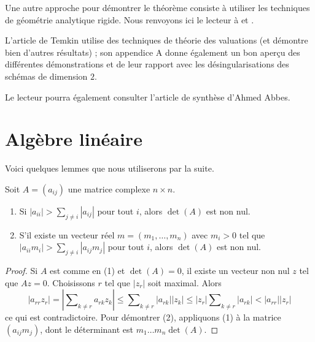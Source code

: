 \medskip\noindent
Une autre approche pour démontrer le théorème consiste à utiliser
les techniques de géométrie analytique rigide. Nous renvoyons ici le lecteur à
\cite{vanderPut} et \cite{Arzdorf-Wewers}.

\medskip\noindent
L'article \cite{Temkin} de Temkin utilise des techniques de théorie des valuations
(et démontre bien d'autres résultats) ; son appendice A donne également
un bon aperçu des différentes démonstrations et de leur rapport avec
les désingularisations des schémas de dimension $2$.

\medskip\noindent
Le lecteur pourra également consulter l'article de synthèse
\cite{Abbes-ssr} d'Ahmed Abbes.






\section{Algèbre linéaire}
\label{section-linear-algebra}

\noindent
Voici quelques lemmes que nous utiliserons par la suite.

\begin{lemma}
\label{lemma-recurring}
\begin{reference}
\cite[Theorem I]{Taussky}
\end{reference}
Soit $A = (a_{ij})$ une matrice complexe $n \times n$.
\begin{enumerate}
\item Si $|a_{ii}| > \sum_{j \not = i} |a_{ij}|$ pour tout $i$, alors
$\det(A)$ est non nul.
\item S'il existe un vecteur réel $m = (m_1, \ldots, m_n)$
avec $m_i > 0$ tel que $|a_{ii} m_i| > \sum_{j \not = i} |a_{ij}m_j|$
pour tout $i$, alors $\det(A)$ est non nul.
\end{enumerate}
\end{lemma}

\begin{proof}
Si $A$ est comme en (1) et $\det(A) = 0$, il existe un vecteur non nul
$z$ tel que $Az = 0$. Choisissons $r$ tel que $|z_r|$ soit maximal. Alors
$$
|a_{rr} z_r| = |\sum\nolimits_{k \not = r} a_{rk}z_k| \leq
\sum\nolimits_{k \not = r} |a_{rk}||z_k| \leq
|z_r| \sum\nolimits_{k \not = r} |a_{rk}| < |a_{rr}||z_r|
$$
ce qui est contradictoire. Pour démontrer (2), appliquons (1) à la matrice
$(a_{ij}m_j)$, dont le déterminant est $m_1 \ldots m_n \det(A)$.
\end{proof}

